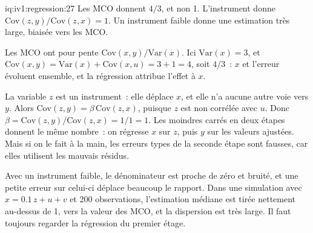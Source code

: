 \begin{solution}{iq:iv1:regression:27}
Les MCO donnent $4/3$, et non 1. L'instrument donne $\mathrm{Cov}(z, y)/\mathrm{Cov}(z, x) = 1$. Un instrument faible donne une estimation très large, biaisée vers les MCO.

Les MCO ont pour pente $\mathrm{Cov}(x, y)/\mathrm{Var}(x)$. Ici $\mathrm{Var}(x) = 3$, et $\mathrm{Cov}(x, y) = \mathrm{Var}(x) + \mathrm{Cov}(x, u) = 3 + 1 = 4$, soit $4/3$~: $x$ et l'erreur évoluent ensemble, et la régression attribue l'effet à $x$.

La variable $z$ est un instrument~: elle déplace $x$, et elle n'a aucune autre voie vers $y$. Alors $\mathrm{Cov}(z, y) = \beta\,\mathrm{Cov}(z, x)$, puisque $z$ est non corrélée avec $u$. Donc $\beta = \mathrm{Cov}(z, y)/\mathrm{Cov}(z, x) = 1/1 = 1$. Les moindres carrés en deux étapes donnent le même nombre~: on régresse $x$ sur $z$, puis $y$ sur les valeurs ajustées. Mais si on le fait à la main, les erreurs types de la seconde étape sont fausses, car elles utilisent les mauvais résidus.

Avec un instrument faible, le dénominateur est proche de zéro et bruité, et une petite erreur sur celui-ci déplace beaucoup le rapport. Dans une simulation avec $x = 0.1\,z + u + v$ et 200 observations, l'estimation médiane est tirée nettement au-dessus de 1, vers la valeur des MCO, et la dispersion est très large. Il faut toujours regarder la régression du premier étage.

\end{solution}

